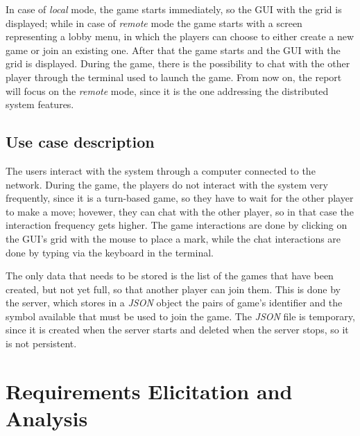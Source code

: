 \documentclass{scrartcl}
\begin{document}
In case of \textit{local} mode, the game starts immediately, so the GUI with the grid is displayed; while in case of
\textit{remote} mode the game starts with a screen representing a lobby menu, in which the players can choose to
either create a new game or join an existing one. After that the game starts and the GUI with the grid is displayed.
During the game, there is the possibility to chat with the other player through the terminal used to launch the game.
From now on, the report will focus on the \textit{remote} mode, since it is the one addressing the distributed system
features.

\subsection{Use case description}\label{use-case-description}

The users interact with the system through a computer connected to the network. During the game, the players do not
interact with the system very frequently, since it is a turn-based game, so they have to wait for the other player to
make a move; hovewer, they can chat with the other player, so in that case the interaction frequency gets higher.
The game interactions are done by clicking on the GUI's grid with the mouse to place a mark, while the chat
interactions are done by typing via the keyboard in the terminal.

The only data that needs to be stored is the list of the games that have been created, but not yet full, so that
another player can join them. This is done by the server, which stores in a \textit{JSON} object the pairs of
game's identifier and the symbol available that must be used to join the game. The \textit{JSON} file is temporary,
since it is created when the server starts and deleted when the server stops, so it is not persistent.

\section{Requirements Elicitation and Analysis}\label{requirements}
\end{document}
